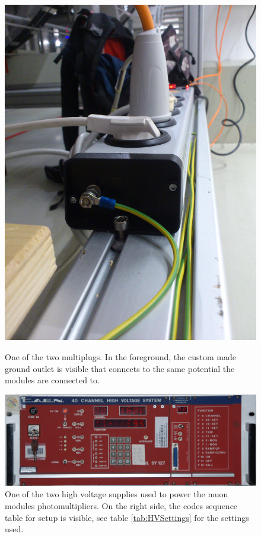 \begin{figure}
\begin{minipage}{0.3\textwidth}
		\includegraphics[angle = 90, width =\textwidth]{graphics/muonModules/mainSpec/multiplug.jpg}
		\caption[Grounded multiplug]{One of the two multiplugs. In the foreground, the custom made ground outlet is visible that connects to the same potential the modules are connected to.}
		\label{fig:multiplug}
	\end{minipage}
	\includegraphics[width = \textwidth]{graphics/muonModules/mainSpec/HV.jpg}
	\caption[High voltage supplies]{One of the two high voltage supplies used to power the muon modules photomultipliers. On the right side, the codes sequence table for setup is visible, see table \ref{tab:HVSettings} for the settings used.}
	\label{fig:HV}
  \end{figure}
